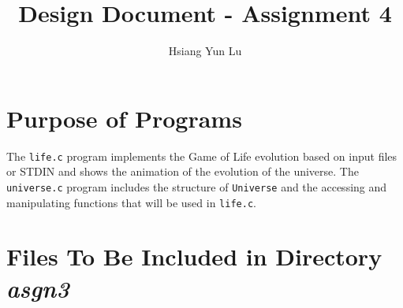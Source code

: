 \documentclass[12pt]{article}
\title{Design Document - Assignment 4}
\author{Hsiang Yun Lu}
\begin{document}
\maketitle

\section{Purpose of Programs}

The \texttt{life.c} program implements the Game of Life evolution based on input files or STDIN and shows the animation of the evolution of the universe. The \texttt{universe.c} program includes the structure of \texttt{Universe} and the accessing and manipulating functions that will be used in \texttt{life.c}.

\section{Files To Be Included in Directory \textit{asgn3}}
\end{document}
